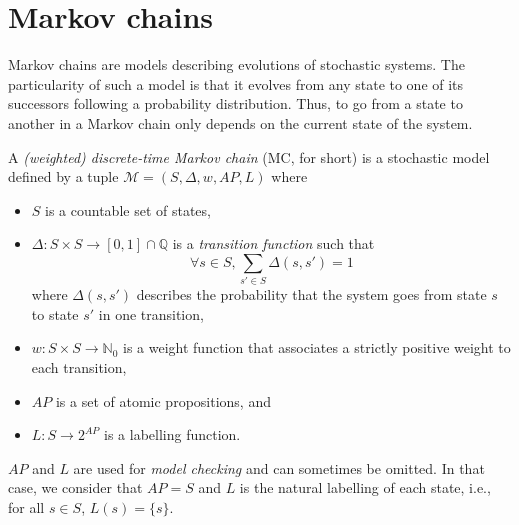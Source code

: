 \section{Markov chains}
Markov chains are models describing evolutions of stochastic systems.
The particularity of such a model is that it evolves from any state to one of its successors following a probability distribution.
Thus, to go from a state to another in a Markov chain only depends on the current state of the system.
\begin{definition}
  A \textit{(weighted) discrete-time Markov chain} (MC, for short) is a stochastic model defined by a tuple $\mathcal{M}=(S, \Delta, w, AP, L)$ where
	\begin{itemize}
		\item $S$ is a countable set of states,
		\item $\Delta: S \times S \rightarrow [0,1] \cap \mathbb{Q}$ is a  \textit{transition function} such that \[\forall s \in S, \sum_{s' \in S}\Delta(s, s')= 1\]
		where $\Delta(s, s')$ describes the probability that the system goes from state $s$ to state $s'$ in one transition,
    \item $w: S \times S \rightarrow \mathbb{N}_0$ %
      is a weight function that associates a strictly positive weight to each transition,
    \item $AP$ is a set of atomic propositions, and
    \item $L: S \rightarrow 2^{AP}$ is a labelling function.
	\end{itemize}
\end{definition}
\begin{remark}
  $AP$ and $L$ are used for \textit{model checking} and can sometimes be omitted. In that case, we consider that $AP = S$ and $L$ is the natural labelling of each state, i.e., for all $s \in S$, $L(s) = \{s\}$.
\end{remark}

